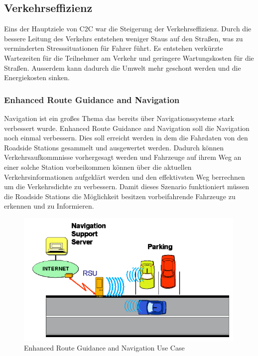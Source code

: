 \subsection{Verkehrseffizienz}
Eins der Hauptziele von \acl{C2C} war die Steigerung der Verkehrseffizienz. Durch die bessere Leitung des Verkehrs entstehen weniger Staus auf den Straßen, was zu verminderten Stresssituationen für Fahrer führt. Es entstehen verkürzte Wartezeiten für die Teilnehmer am Verkehr und geringere Wartungskosten für die Straßen. Ausserdem kann dadurch die Umwelt mehr geschont werden und die Energiekosten sinken. 

\subsubsection{Enhanced Route Guidance and Navigation}
Navigation ist ein großes Thema das bereits über Navigationssysteme stark verbessert wurde. Enhanced Route Guidance and Navigation soll die Navigation noch einmal verbessern. Dies soll erreicht werden in dem die Fahrdaten von den Roadside Stations gesammelt und ausgewertet werden. Dadurch können Verkehrsaufkommnisse vorhergesagt werden und Fahrzeuge auf ihrem Weg an einer solche Station vorbeikommen können über die aktuellen Verkehrsinformationen aufgeklärt werden und den effektivsten Weg berrechnen um die Verkehrsdichte zu verbessern. Damit dieses Szenario funktioniert müssen die Roadside Stations die Möglichkeit besitzen vorbeifahrende Fahrzeuge zu erkennen und zu Informieren. 
\begin{figure}[htbp]
\includegraphics[width=0.99\textwidth]{content/images/06_use_cases/ergn.png}
\caption{Enhanced Route Guidance and Navigation Use Case\cite{etsi102638}}
\label{fig:ergn}
\end{figure}
